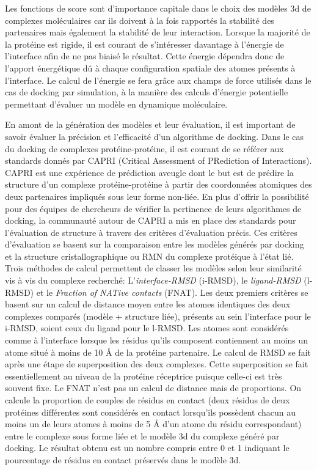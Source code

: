 Les fonctions de score sont d'importance capitale dans le choix des modèles 3d de complexes moléculaires car ils doivent à la fois rapportés la stabilité des partenaires mais également la stabilité de leur interaction. Lorsque la majorité de la protéine est rigide, il est courant de s'intéresser davantage à l'énergie de l'interface afin de ne pas biaisé le résultat. Cette énergie dépendra donc de l'apport énergétique dû à chaque configuration spatiale des atomes présents à l'interface. Le calcul de l'énergie se fera grâce aux champs de force utilisés dans le cas de docking par simulation, à la manière des calculs d'énergie potentielle permettant d'évaluer un modèle en dynamique moléculaire.

En amont de la génération des modèles et leur évaluation, il est important de savoir évaluer la précision et l'efficacité d'un algorithme de docking. Dans le cas du docking de complexes protéine-protéine, il est courant de se référer aux standards donnés par CAPRI (Critical Assessment of PRediction of Interactions). CAPRI est une expérience de prédiction aveugle dont le but est de prédire la structure d'un complexe protéine-protéine à partir des coordonnées atomiques des deux partenaires impliqués sous leur forme non-liée. En plus d'offrir la possibilité pour des équipes de chercheurs de vérifier la pertinence de leurs algorithmes de docking, la communauté autour de CAPRI a mis en place des standards pour l'évaluation de structure à travers des critères d'évaluation précis. Ces critères d'évaluation se basent sur la comparaison entre les modèles générés par docking et la structure cristallographique ou RMN du complexe protéique à l'état lié. Trois méthodes de calcul permettent de classer les modèles selon leur similarité vis à vis du complexe recherché: L'\textit{interface-RMSD} (i-RMSD), le \textit{ligand-RMSD} (l-RMSD) et le \textit{Fraction of NATive contacts} (FNAT). Les deux premiers critères se basent sur un calcul de distance moyen entre les atomes identiques des deux complexes comparés (modèle + structure liée), présents au sein l'interface pour le i-RMSD, soient ceux du ligand pour le l-RMSD. Les atomes sont considérés comme à l'interface lorsque les résidus qu'ils composent contiennent au moins un atome situé à moins de 10 \r{A} de la protéine partenaire. Le calcul de RMSD se fait après une étape de superposition des deux complexes. Cette superposition se fait essentiellement au niveau de la protéine réceptrice puisque celle-ci est très souvent fixe. Le FNAT n'est pas un calcul de distance mais de proportions. On calcule la proportion de couples de résidus en contact (deux résidus de deux protéines différentes sont considérés en contact lorsqu'ils possèdent chacun au moins un de leurs atomes à moins de 5 \r{A} d'un atome du résidu correspondant) entre le complexe sous forme liée et le modèle 3d du complexe généré par docking. Le résultat obtenu est un nombre compris entre 0 et 1 indiquant le pourcentage de résidus en contact préservés dans le modèle 3d.


